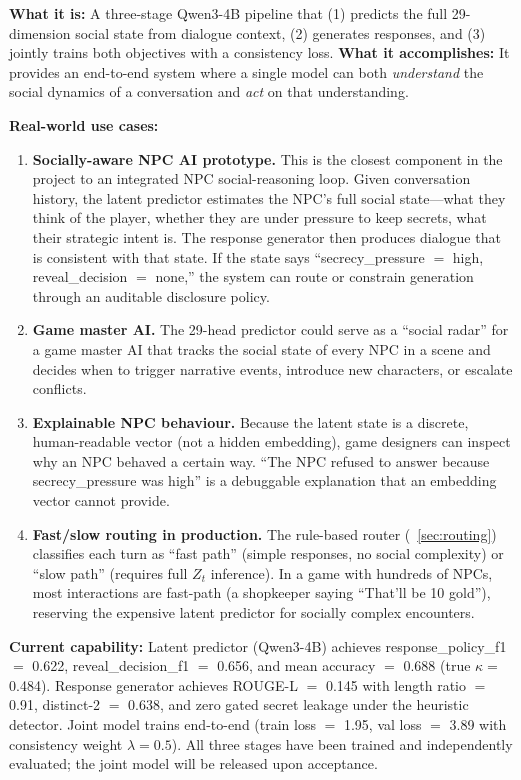 \documentclass[11pt]{article}
\begin{document}
\textbf{What it is:} A three-stage Qwen3-4B pipeline that (1) predicts the full 29-dimension social state from dialogue context, (2) generates responses, and (3) jointly trains both objectives with a consistency loss.
\textbf{What it accomplishes:} It provides an end-to-end system where a single model can both \textit{understand} the social dynamics of a conversation and \textit{act} on that understanding.

\textbf{Real-world use cases:}
\begin{enumerate}
    \item \textbf{Socially-aware NPC AI prototype.} This is the closest component in the project to an integrated NPC social-reasoning loop.
    Given conversation history, the latent predictor estimates the NPC's full social state---what they think of the player, whether they are under pressure to keep secrets, what their strategic intent is.
    The response generator then produces dialogue that is consistent with that state.
    If the state says ``secrecy\_pressure $=$ high, reveal\_decision $=$ none,'' the system can route or constrain generation through an auditable disclosure policy.
    \item \textbf{Game master AI.} The 29-head predictor could serve as a ``social radar'' for a game master AI that tracks the social state of every NPC in a scene and decides when to trigger narrative events, introduce new characters, or escalate conflicts.
    \item \textbf{Explainable NPC behaviour.} Because the latent state is a discrete, human-readable vector (not a hidden embedding), game designers can inspect why an NPC behaved a certain way.
    ``The NPC refused to answer because secrecy\_pressure was high'' is a debuggable explanation that an embedding vector cannot provide.
    \item \textbf{Fast/slow routing in production.} The rule-based router (\textsection~\ref{sec:routing}) classifies each turn as ``fast path'' (simple responses, no social complexity) or ``slow path'' (requires full $Z_t$ inference).
    In a game with hundreds of NPCs, most interactions are fast-path (a shopkeeper saying ``That'll be 10 gold''), reserving the expensive latent predictor for socially complex encounters.
\end{enumerate}

\textbf{Current capability:} Latent predictor (Qwen3-4B) achieves response\_policy\_f1 $=$ 0.622, reveal\_decision\_f1 $=$ 0.656, and mean accuracy $=$ 0.688 (true $\kappa{=}$0.484).
Response generator achieves ROUGE-L $=$ 0.145 with length ratio $=$ 0.91, distinct-2 $=$ 0.638, and zero gated secret leakage under the heuristic detector.
Joint model trains end-to-end (train loss $=$ 1.95, val loss $=$ 3.89 with consistency weight $\lambda{=}0.5$).
All three stages have been trained and independently evaluated; the joint model will be released upon acceptance.
\end{document}
